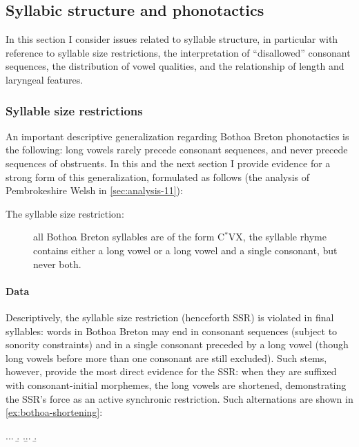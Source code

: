 \subsection{Syllabic structure and phonotactics}
\label{sec:syll-struct-phon}

In this section I consider issues related to syllable structure, in particular with reference to syllable size restrictions, the interpretation of \enquote{disallowed} consonant sequences, the distribution of vowel qualities, and the relationship of length and laryngeal features.

\subsubsection{Syllable size restrictions}
\label{sec:syll-size-restr}

An important descriptive generalization regarding Bothoa Breton phonotactics is the following: long vowels rarely precede consonant sequences, and never precede sequences of obstruents. In this and the next section I provide evidence for a strong form of this generalization, formulated as follows (\cf the analysis of Pembrokeshire Welsh in \cref{sec:analysis-11}):

\begin{description}
\item[The syllable size restriction:] all Bothoa Breton syllables are of the form C$^*$VX, \ie the syllable rhyme contains either a long vowel or a long vowel and a single consonant, but never both.
\end{description}

\paragraph{Data}
\label{sec:data-3}

Descriptively, the syllable size restriction (henceforth SSR) is violated in final syllables: words in Bothoa Breton may end in consonant sequences (subject to sonority constraints) and in a single consonant preceded by a long vowel (though long vowels before more than one consonant are still excluded). Such stems, however, provide the most direct evidence for the SSR: when they are suffixed with consonant-initial morphemes, the long vowels are shortened, demonstrating the SSR's force as an active synchronic restriction. Such alternations are shown in \cref{ex:bothoa-shortening}:

\ex.\label{ex:bothoa-shortening}\a.\a.
\b.
\z.\b.\a.
\b.


